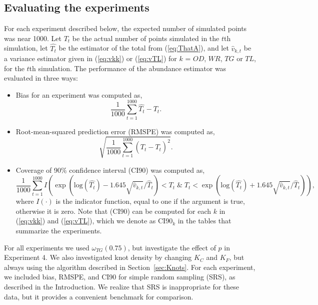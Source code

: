 \documentclass[12pt, titlepage]{article}\usepackage[]{graphicx}\usepackage[]{color}
\def\log{\textrm{log}}
\begin{document}

\subsection{Evaluating the experiments} \label{sec:EvalExp}

For each experiment described below, the expected number of simulated points was near 1000.  Let $T_t$ be the actual number of points simulated in the $t$th simulation, let $\hat{T_t}$ be the estimator of the total from (\ref{eq:ThatA}), and let $\hat{v}_{k,t}$ be a variance estimator given in (\ref{eq:vkk}) or (\ref{eq:vTL}) for $k$ = $OD$, $WR$, $TG$ or $TL$,  for the $t$th simulation.  The performance of the abundance estimator was evaluated in three ways:

\begin{itemize}

\item Bias for an experiment was computed as,
\[
\frac{1}{1000}\sum_{t=1}^{1000} \hat{T_t} - T_t.
\]

\item Root-mean-squared prediction error (RMSPE) was computed as,
\[
\sqrt{\frac{1}{1000}\sum_{t=1}^{1000} (\hat{T_t} - T_t)^2}.
\]

\item Coverage of 90\% confidence interval (CI90) was computed as,
\[
\frac{1}{1000}\sum_{t=1}^{1000} I\left(\exp(\log(\hat{T_t}) - 1.645\sqrt{\hat{v}_{k,t}}/\hat{T}_t) < T_t 
\; \& \;  T_t < \exp(\log(\hat{T_t}) + 1.645\sqrt{\hat{v}_{k,t}}/\hat{T}_t) \right),
\]
where $I(\cdot)$ is the indicator function, equal to one if the argument is true, otherwise it is zero. Note that (CI90) can be computed for each $k$ in (\ref{eq:vkk}) and (\ref{eq:vTL}), which we denote as CI90$_k$ in the tables that summarize the experiments.

\end{itemize}

For all experiments we used $\omega_{TG}(0.75)$, but investigate the effect of $p$ in Experiment 4. We also investigated knot density by changing $K_C$ and $K_F$, but always using the algorithm described in Section~\ref{sec:Knots}. For each experiment, we included bias, RMSPE, and CI90 for simple random sampling (SRS), as described in the Introduction.  We realize that SRS is inappropriate for these data, but it provides a convenient benchmark for comparison.

\end{document}
